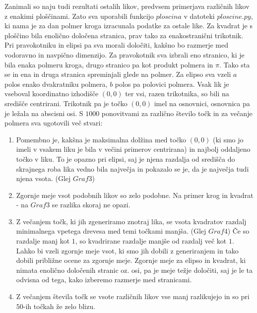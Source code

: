 \documentclass[a4paper]{article}
\begin{document}
Zanimali so naju tudi rezultati ostalih likov, predvsem primerjava različnih likov z enakimi ploščinami. Zato sva uporabili funkcijo $ploscina$ v datoteki \colorbox{gray!10}{$ploscine.py$}, ki nama je za dan polmer kroga izracunala podatke za ostale like.
Za kvadrat je s ploščino bila enolično določena stranica, prav tako za enakostranični trikotnik. Pri pravokotniku in elipsi pa sva morali določiti, kakšno bo razmerje med vodoravno in navpično dimenzijo. Za pravokotnik sva izbrali eno stranico, ki je bila enaka polmeru kroga, drugo stranico pa kot produkt polmera in $\pi$. Tako sta se in ena in druga stranica spreminjali glede na polmer.
Za elipso sva vzeli $a$ polos enako dvakratniku polmera, $b$ polos pa polovici polmera. 
Vsak lik je vseboval koordinatno izhodišče $(0,0)$ ter vsi, razen trikotnika, so bili na središče centrirani. Trikotnik pa je točko $(0,0)$ imel na osnovnici, osnovnica pa je ležala na abscisni osi. 
\pagebreak
S $1000$ ponovitvami za različno število točk in za večanje polmera sva ugotovili več stvari:
\begin{enumerate} 
\item Pomembno je, kakšna je maksimalna dolžina med točko $(0,0)$ (ki smo jo imeli v vsakem liku je bila v večini primerov centrirana) in najbolj oddaljeno točko v liku. To je opazno pri elipsi, saj je njena razdalja od središča do skrajnega roba lika vedno bila največja in pokazalo se je, da je največja tudi njena vsota. (\small{Glej $Graf 3$})
\item Zgornje meje vsot podobnih likov so zelo podobne. Na primer krog in kvadrat - na \small{$Graf 3$} se razlika skoraj ne opazi. 
\item Z večanjem točk, ki jih zgeneriramo znotraj lika, se vsota kvadratov razdalj minimalnega vpetega drevesa med temi točkami manjša. (\small{Glej $Graf 4$}) Če so razdalje manj kot $1$, so kvadrirane razdalje manjše od razdalj več kot $1$. Lahko bi vzeli zgornje meje vsot, ki smo jih dobili z generiranjem in tako dobili približne ocene za zgornje meje. Zgornje meje za elipso in kvadrat, ki nimata enolično določenih stranic oz. osi, pa je meje težje določiti, saj je le ta odvisna od tega, kako izberemo razmerje med stranicami. 
\item Z večanjem števila točk se vsote različnih likov vse manj razlikujejo in so pri $50$-ih točkah že zelo blizu. 
\end{enumerate}
\end{document}
